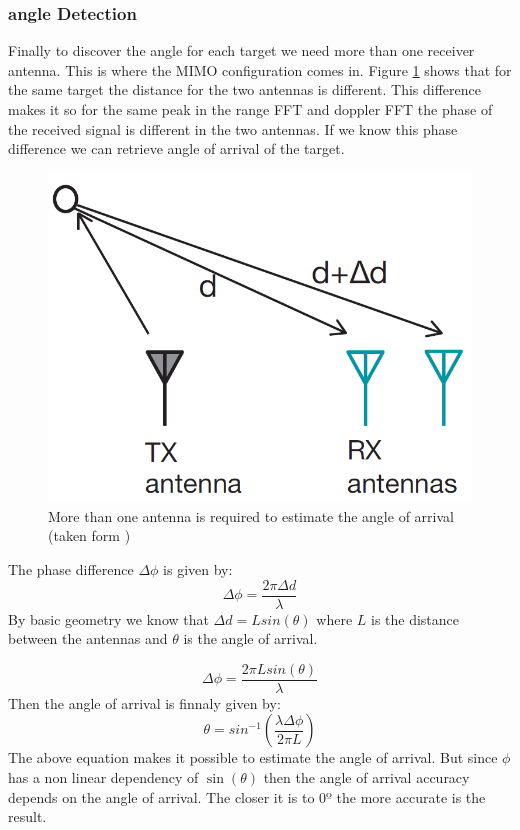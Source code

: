 \subsubsection{angle Detection}
Finally to discover the angle for each target we need more than one receiver antenna. This is where the \ac{MIMO} configuration comes in. Figure \ref{fig:angle} shows that for the same target the distance for the two antennas is different.  This difference makes it so for the same peak in the range \ac{FFT} and doppler \ac{FFT} the phase of the received signal is different in the two antennas. If we know this phase difference we can retrieve angle of arrival of the target. 
\begin{figure}[h] 
\centerline{\includegraphics [width=0.5 \textwidth]{imgs/chapter2/angle.png}}
\caption[Angle of arrival estimation using more than one antenna]{More than one antenna is required to estimate the angle of arrival (taken form \cite{iovescu2017fundamentals})}
\label{fig:angle}
\end{figure}
The phase difference $\Delta \phi$ is given by:
\begin{equation}
    \Delta \phi=\frac{2 \pi \Delta d}{\lambda}
\end{equation}
By basic geometry we know that $\Delta d =L sin(\theta)$ where $L$ is the distance between the antennas and $\theta$ is the angle of arrival. 

\begin{equation}
    \Delta \phi=\frac{2 \pi L sin(\theta)}{\lambda}
\end{equation}
Then the angle of arrival is finnaly given by:
\begin{equation}
    \theta = sin^{-1}(\frac{\lambda \Delta \phi}{2 \pi L})
\end{equation}
The above equation makes it possible to estimate the angle of arrival. But since $\phi$ has a non linear dependency of $\sin(\theta)$ then the angle of arrival accuracy depends on the angle of arrival. The closer it is to $0º$ the more accurate is the result.

